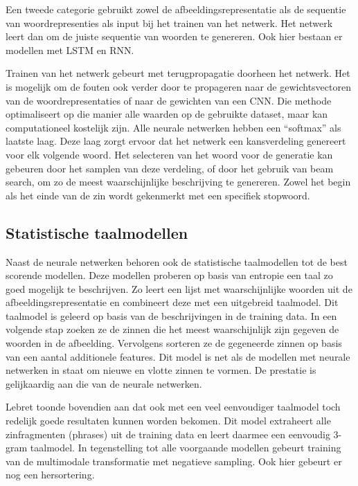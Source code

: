 Een tweede categorie gebruikt zowel de afbeeldingsrepresentatie als de sequentie van 
woordrepresenties als input bij het trainen van het netwerk. Het netwerk leert dan om de juiste sequentie van woorden te genereren. Ook hier bestaan er modellen met LSTM \cite{Donahue2015,Google} en RNN\cite{Karpathy2015}. 

Trainen van het netwerk gebeurt met terugpropagatie doorheen het netwerk. Het is mogelijk om de fouten ook verder door te propageren naar de gewichtsvectoren van de woordrepresentaties of naar de gewichten van een CNN. Die methode optimaliseert op die manier alle waarden op de gebruikte dataset, maar kan computationeel kostelijk zijn.
Alle neurale netwerken hebben een ``softmax'' als laatste laag. Deze laag zorgt ervoor dat het netwerk een kansverdeling genereert voor elk volgende woord. 
Het selecteren van het woord voor de generatie kan gebeuren door het samplen van deze verdeling, of door het gebruik van beam search, om zo de meest waarschijnlijke beschrijving te genereren.  Zowel het begin als het einde van de zin wordt gekenmerkt met een specifiek stopwoord.

\subsection{Statistische taalmodellen}
Naast de neurale netwerken behoren ook de statistische taalmodellen tot de best scorende modellen.
Deze modellen proberen op basis van entropie een taal zo goed mogelijk te beschrijven. Zo leert \cite{Mitchell2015} een lijst met waarschijnlijke woorden uit de afbeeldingsrepresentatie en combineert deze met een uitgebreid taalmodel. Dit taalmodel is geleerd op basis van de beschrijvingen in de training data. In een volgende stap zoeken ze de zinnen die het meest waarschijnlijk zijn gegeven de woorden in de afbeelding. Vervolgens sorteren ze de gegeneerde zinnen op basis van een aantal additionele features. Dit model is net als de modellen met neurale netwerken in staat om nieuwe en vlotte zinnen te vormen. De prestatie is gelijkaardig aan die van de neurale netwerken.

Lebret \cite{Lebret2015} toonde bovendien aan dat ook met een veel eenvoudiger taalmodel toch redelijk goede resultaten kunnen worden bekomen. Dit model extraheert alle zinfragmenten (phrases) uit de training data en leert daarmee een eenvoudig 3-gram taalmodel. In tegenstelling tot alle voorgaande modellen gebeurt training van de multimodale transformatie met negatieve sampling. Ook hier gebeurt er nog een hersortering.

